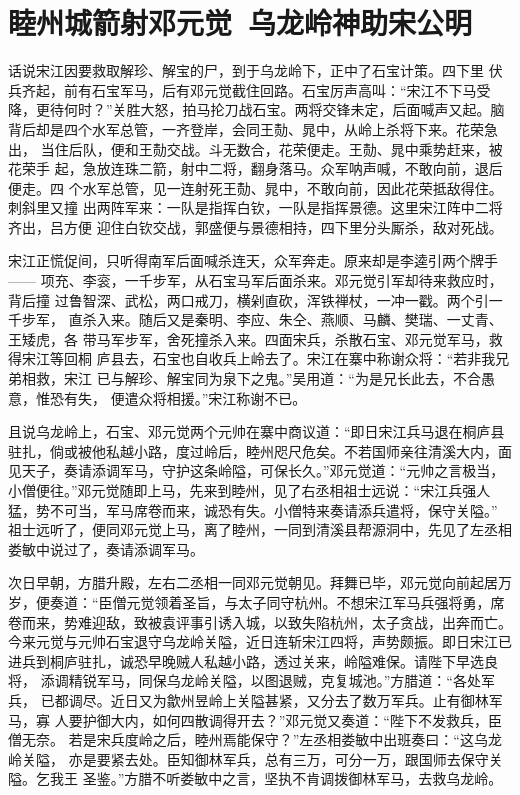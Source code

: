 \chapter{睦州城箭射邓元觉~乌龙岭神助宋公明}

话说宋江因要救取解珍、解宝的尸，到于乌龙岭下，正中了石宝计策。四下里
伏兵齐起，前有石宝军马，后有邓元觉截住回路。石宝厉声高叫：“宋江不下马受
降，更待何时？”关胜大怒，拍马抡刀战石宝。两将交锋未定，后面喊声又起。脑
背后却是四个水军总管，一齐登岸，会同王𪟝、晁中，从岭上杀将下来。花荣急出，
当住后队，便和王𪟝交战。斗无数合，花荣便走。王𪟝、晁中乘势赶来，被花荣手
起，急放连珠二箭，射中二将，翻身落马。众军呐声喊，不敢向前，退后便走。四
个水军总管，见一连射死王𪟝、晁中，不敢向前，因此花荣抵敌得住。刺斜里又撞
出两阵军来：一队是指挥白钦，一队是指挥景德。这里宋江阵中二将齐出，吕方便
迎住白钦交战，郭盛便与景德相持，四下里分头厮杀，敌对死战。

宋江正慌促间，只听得南军后面喊杀连天，众军奔走。原来却是李逵引两个牌手——
项充、李衮，一千步军，从石宝马军后面杀来。邓元觉引军却待来救应时，背后撞
过鲁智深、武松，两口戒刀，横剁直砍，浑铁禅杖，一冲一戳。两个引一千步军，
直杀入来。随后又是秦明、李应、朱仝、燕顺、马麟、樊瑞、一丈青、王矮虎，各
带马军步军，舍死撞杀入来。四面宋兵，杀散石宝、邓元觉军马，救得宋江等回桐
庐县去，石宝也自收兵上岭去了。宋江在寨中称谢众将：“若非我兄弟相救，宋江
已与解珍、解宝同为泉下之鬼。”吴用道：“为是兄长此去，不合愚意，惟恐有失，
便遣众将相援。”宋江称谢不已。

且说乌龙岭上，石宝、邓元觉两个元帅在寨中商议道：“即日宋江兵马退在桐庐县
驻扎，倘或被他私越小路，度过岭后，睦州咫尺危矣。不若国师亲往清溪大内，面
见天子，奏请添调军马，守护这条岭隘，可保长久。”邓元觉道：“元帅之言极当，
小僧便往。”邓元觉随即上马，先来到睦州，见了右丞相祖士远说：“宋江兵强人
猛，势不可当，军马席卷而来，诚恐有失。小僧特来奏请添兵遣将，保守关隘。”
祖士远听了，便同邓元觉上马，离了睦州，一同到清溪县帮源洞中，先见了左丞相
娄敏中说过了，奏请添调军马。

次日早朝，方腊升殿，左右二丞相一同邓元觉朝见。拜舞已毕，邓元觉向前起居万
岁，便奏道：“臣僧元觉领着圣旨，与太子同守杭州。不想宋江军马兵强将勇，席
卷而来，势难迎敌，致被袁评事引诱入城，以致失陷杭州，太子贪战，出奔而亡。
今来元觉与元帅石宝退守乌龙岭关隘，近日连斩宋江四将，声势颇振。即日宋江已
进兵到桐庐驻扎，诚恐早晚贼人私越小路，透过关来，岭隘难保。请陛下早选良将，
添调精锐军马，同保乌龙岭关隘，以图退贼，克复城池。”方腊道：“各处军兵，
已都调尽。近日又为歙州昱岭上关隘甚紧，又分去了数万军兵。止有御林军马，寡
人要护御大内，如何四散调得开去？”邓元觉又奏道：“陛下不发救兵，臣僧无奈。
若是宋兵度岭之后，睦州焉能保守？”左丞相娄敏中出班奏曰：“这乌龙岭关隘，
亦是要紧去处。臣知御林军兵，总有三万，可分一万，跟国师去保守关隘。乞我王
圣鉴。”方腊不听娄敏中之言，坚执不肯调拨御林军马，去救乌龙岭。

